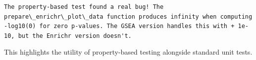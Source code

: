 \begin{lstlisting}[style=transcript]
The property-based test found a real bug! The prepare\_enrichr\_plot\_data function produces infinity when computing -log10(0) for zero p-values. The GSEA version handles this with + 1e-10, but the Enrichr version doesn't.
\end{lstlisting}

This highlights the utility of property-based testing alongside standard unit tests.